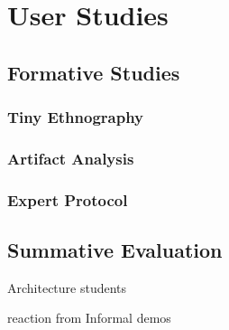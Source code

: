 \chapter{User Studies}

\section{Formative Studies}

\subsection{Tiny Ethnography}

\subsection{Artifact Analysis}

\subsection{Expert Protocol}

\section{Summative Evaluation}

Architecture students

reaction from Informal demos


